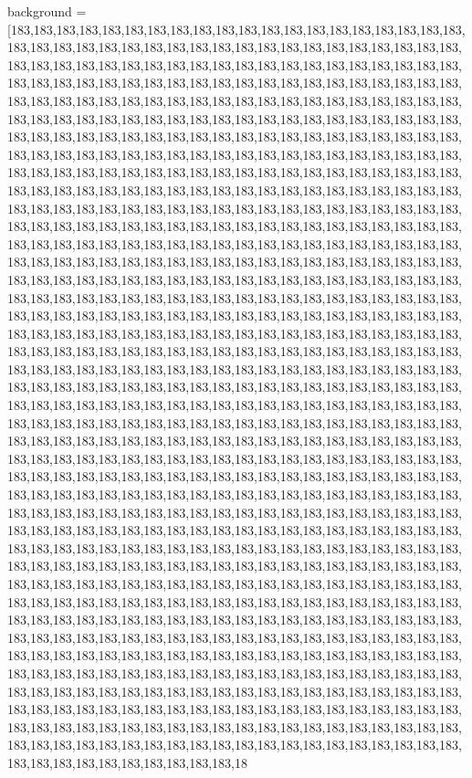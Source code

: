 background = [183,183,183,183,183,183,183,183,183,183,183,183,183,183,183,183,183,183,183,183,183,183,183,183,183,183,183,183,183,183,183,183,183,183,183,183,183,183,183,183,183,183,183,183,183,183,183,183,183,183,183,183,183,183,183,183,183,183,183,183,183,183,183,183,183,183,183,183,183,183,183,183,183,183,183,183,183,183,183,183,183,183,183,183,183,183,183,183,183,183,183,183,183,183,183,183,183,183,183,183,183,183,183,183,183,183,183,183,183,183,183,183,183,183,183,183,183,183,183,183,183,183,183,183,183,183,183,183,183,183,183,183,183,183,183,183,183,183,183,183,183,183,183,183,183,183,183,183,183,183,183,183,183,183,183,183,183,183,183,183,183,183,183,183,183,183,183,183,183,183,183,183,183,183,183,183,183,183,183,183,183,183,183,183,183,183,183,183,183,183,183,183,183,183,183,183,183,183,183,183,183,183,183,183,183,183,183,183,183,183,183,183,183,183,183,183,183,183,183,183,183,183,183,183,183,183,183,183,183,183,183,183,183,183,183,183,183,183,183,183,183,183,183,183,183,183,183,183,183,183,183,183,183,183,183,183,183,183,183,183,183,183,183,183,183,183,183,183,183,183,183,183,183,183,183,183,183,183,183,183,183,183,183,183,183,183,183,183,183,183,183,183,183,183,183,183,183,183,183,183,183,183,183,183,183,183,183,183,183,183,183,183,183,183,183,183,183,183,183,183,183,183,183,183,183,183,183,183,183,183,183,183,183,183,183,183,183,183,183,183,183,183,183,183,183,183,183,183,183,183,183,183,183,183,183,183,183,183,183,183,183,183,183,183,183,183,183,183,183,183,183,183,183,183,183,183,183,183,183,183,183,183,183,183,183,183,183,183,183,183,183,183,183,183,183,183,183,183,183,183,183,183,183,183,183,183,183,183,183,183,183,183,183,183,183,183,183,183,183,183,183,183,183,183,183,183,183,183,183,183,183,183,183,183,183,183,183,183,183,183,183,183,183,183,183,183,183,183,183,183,183,183,183,183,183,183,183,183,183,183,183,183,183,183,183,183,183,183,183,183,183,183,183,183,183,183,183,183,183,183,183,183,183,183,183,183,183,183,183,183,183,183,183,183,183,183,183,183,183,183,183,183,183,183,183,183,183,183,183,183,183,183,183,183,183,183,183,183,183,183,183,183,183,183,183,183,183,183,183,183,183,183,183,183,183,183,183,183,183,183,183,183,183,183,183,183,183,183,183,183,183,183,183,183,183,183,183,183,183,183,183,183,183,183,183,183,183,183,183,183,183,183,183,183,183,183,183,183,183,183,183,183,183,183,183,183,183,183,183,183,183,183,183,183,183,183,183,183,183,183,183,183,183,183,183,183,183,183,183,183,183,183,183,183,183,183,183,183,183,183,183,183,183,183,183,183,183,183,183,183,183,183,183,183,183,183,183,183,183,183,183,183,183,183,183,183,183,183,183,183,183,183,183,183,183,183,183,183,183,183,183,183,183,183,183,183,183,183,183,183,183,183,183,183,183,183,183,183,183,183,183,183,183,183,183,183,183,183,183,183,183,183,183,183,183,183,183,183,183,183,183,183,183,183,183,183,183,183,183,183,183,183,183,183,183,183,183,183,183,183,183,183,183,183,183,183,183,183,183,183,183,183,183,183,183,183,183,183,183,183,183,183,183,183,183,183,183,183,183,183,183,183,183,183,183,183,183,183,183,183,183,183,183,183,183,183,183,183,183,183,183,183,183,183,183,183,183,183,183,183,183,183,183,183,183,183,183,183,183,183,183,183,183,183,183,183,183,183,183,183,183,183,183,183,183,183,183,183,183,183,183,183,183,183,183,183,183,183,183,183,183,183,183,183,183,183,183,183,183,183,18